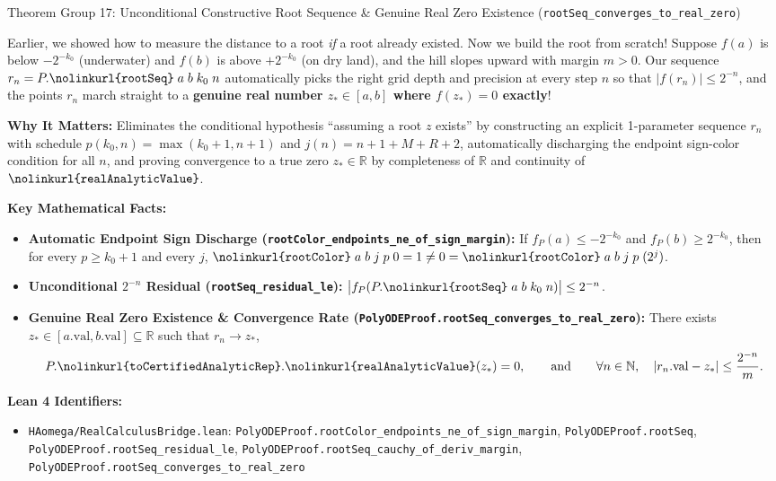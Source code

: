 \documentclass[11pt,a4paper]{article}
\newcommand{\N}{\ensuremath{\mathbb{N}}}
\newcommand{\R}{\ensuremath{\mathbb{R}}}
\newcommand{\lean}[1]{\texttt{\nolinkurl{#1}}}
\begin{document}
\vspace{6pt}

\begin{thmcard}{Theorem Group 17: Unconditional Constructive Root Sequence \& Genuine Real Zero Existence (\lean{rootSeq\_converges\_to\_real\_zero})}
\begin{eli5box}
Earlier, we showed how to measure the distance to a root \emph{if} a root already existed. Now we build the root from scratch! Suppose $f(a)$ is below $-2^{-k_0}$ (underwater) and $f(b)$ is above $+2^{-k_0}$ (on dry land), and the hill slopes upward with margin $m > 0$. Our sequence $r_n = P.\lean{rootSeq}\;a\;b\;k_0\;n$ automatically picks the right grid depth and precision at every step $n$ so that $|f(r_n)| \le 2^{-n}$, and the points $r_n$ march straight to a \textbf{genuine real number $z_* \in [a, b]$ where $f(z_*) = 0$ exactly}!
\end{eli5box}

\textbf{Why It Matters:}
Eliminates the conditional hypothesis ``assuming a root $z$ exists'' by constructing an explicit 1-parameter sequence $r_n$ with schedule $p(k_0,n) = \max(k_0+1, n+1)$ and $j(n) = n + 1 + M + R + 2$, automatically discharging the endpoint sign-color condition for all $n$, and proving convergence to a true zero $z_* \in \R$ by completeness of $\R$ and continuity of $\lean{realAnalyticValue}$.

\textbf{Key Mathematical Facts:}
\begin{itemize}
  \item \textbf{Automatic Endpoint Sign Discharge (\lean{rootColor_endpoints_ne_of_sign_margin}):} If $f_P(a) \le -2^{-k_0}$ and $f_P(b) \ge 2^{-k_0}$, then for every $p \ge k_0 + 1$ and every $j$, $\lean{rootColor}\;a\;b\;j\;p\;0 = 1 \neq 0 = \lean{rootColor}\;a\;b\;j\;p\;(2^j)$.
  \item \textbf{Unconditional $2^{-n}$ Residual (\lean{rootSeq_residual_le}):} $\bigl|f_P(P.\lean{rootSeq}\;a\;b\;k_0\;n)\bigr| \le 2^{-n}$.
  \item \textbf{Genuine Real Zero Existence \& Convergence Rate (\lean{PolyODEProof.rootSeq_converges_to_real_zero}):} There exists $z_* \in [a.\mathrm{val}, b.\mathrm{val}] \subseteq \R$ such that $r_n \to z_*$,
  \[
    P.\lean{toCertifiedAnalyticRep}.\lean{realAnalyticValue}(z_*) = 0, \qquad\text{and}\qquad
    \forall n \in \N,\quad |r_n.\mathrm{val} - z_*| \le \frac{2^{-n}}{m}.
  \]
\end{itemize}

\textbf{Lean 4 Identifiers:}
\begin{itemize}
  \item \lean{HAomega/RealCalculusBridge.lean}: \lean{PolyODEProof.rootColor_endpoints_ne_of_sign_margin}, \lean{PolyODEProof.rootSeq}, \lean{PolyODEProof.rootSeq_residual_le}, \lean{PolyODEProof.rootSeq_cauchy_of_deriv_margin}, \lean{PolyODEProof.rootSeq_converges_to_real_zero}
\end{itemize}
\end{thmcard}
\end{document}
